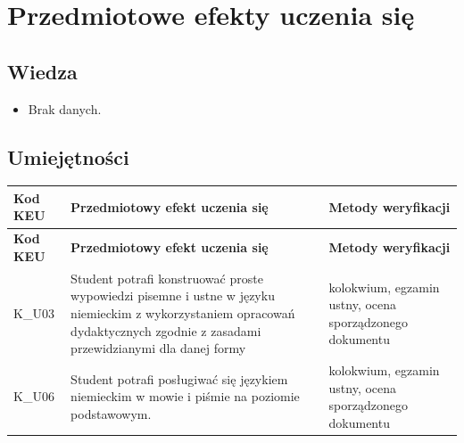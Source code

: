 \documentclass[12pt, a4paper]{article}
\newcommand{\thdrule}{\noalign{\global\setlength{\extrarowheight}{0pt}}}
\newcommand{\thdend}{\noalign{\global\setlength{\extrarowheight}{3pt}}}
\begin{document}
\section{Przedmiotowe efekty uczenia się}

\subsection*{Wiedza}
\begin{itemize}
  \item Brak danych.
\end{itemize}

\subsection*{Umiejętności}
{\scriptsize
\begin{longtable}{m{1.6cm}m{9.0cm}m{4.2cm}}
\thdrule\toprule
\rowcolor{pjatkRed} {\color{white}\footnotesize\textbf{\vphantom{Ag}Kod KEU}} & {\color{white}\footnotesize\textbf{\vphantom{Ag}Przedmiotowy efekt uczenia się}} & {\color{white}\footnotesize\textbf{\vphantom{Ag}Metody weryfikacji}} \\
\midrule\thdend
\endfirsthead
\thdrule\toprule
\rowcolor{pjatkRed} {\color{white}\footnotesize\textbf{\vphantom{Ag}Kod KEU}} & {\color{white}\footnotesize\textbf{\vphantom{Ag}Przedmiotowy efekt uczenia się}} & {\color{white}\footnotesize\textbf{\vphantom{Ag}Metody weryfikacji}} \\
\midrule\thdend
\endhead
  \rowcolor{tableRowLight} K\_U03 & Student potrafi konstruować proste wypowiedzi pisemne i ustne w języku niemieckim z wykorzystaniem opracowań dydaktycznych zgodnie z zasadami przewidzianymi dla danej formy & kolokwium, egzamin ustny, ocena sporządzonego dokumentu \\
  \rowcolor{tableRowAlt} K\_U06 & Student potrafi posługiwać się językiem niemieckim w mowie i piśmie na poziomie podstawowym. & kolokwium, egzamin ustny, ocena sporządzonego dokumentu \\
\bottomrule
\end{longtable}}
\end{document}
